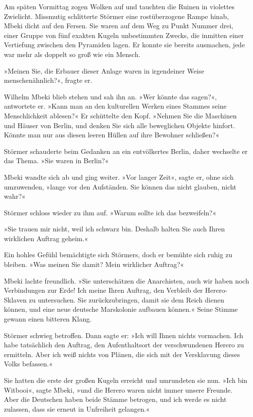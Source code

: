 \bigpar

Am späten Vormittag zogen Wolken auf und tauchten die Ruinen in
violettes Zwielicht. Missmutig schlitterte Störmer eine
rostüberzogene Rampe hinab, Mbeki dicht auf den Fersen. Sie waren
auf dem Weg zu Punkt Nummer drei, einer Gruppe von fünf exakten
Kugeln unbestimmten Zwecks, die inmitten einer Vertiefung zwischen
den Pyramiden lagen. Er konnte sie bereits ausmachen, jede war mehr
als doppelt so groß wie ein Mensch.

»Meinen Sie, die Erbauer dieser Anlage waren in irgendeiner Weise
menschenähnlich?«, fragte er.

Wilhelm Mbeki blieb stehen und sah ihn an. »Wer könnte das sagen?«,
antwortete er. »Kann man an den kulturellen Werken eines Stammes
seine Menschlichkeit ablesen?« Er schüttelte den Kopf. »Nehmen Sie
die Maschinen und Häuser von Berlin, und denken Sie sich alle
beweglichen Objekte hinfort. Könnte man nur aus diesen leeren
Hüllen auf ihre Bewohner schließen?«

Störmer schauderte beim Gedanken an ein entvölkertes Berlin, daher
wechselte er das Thema. »Sie waren in Berlin?«

Mbeki wandte sich ab und ging weiter. »Vor langer Zeit«, sagte er,
ohne sich umzuwenden, »lange vor den Aufständen. Sie können das
nicht glauben, nicht wahr?«

Störmer schloss wieder zu ihm auf. »Warum sollte ich das
bezweifeln?«

»Sie trauen mir nicht, weil ich schwarz bin. Deshalb halten Sie
auch Ihren wirklichen Auftrag geheim.«

Ein hohles Gefühl bemächtigte sich Störmers, doch er bemühte sich
ruhig zu bleiben. »Was meinen Sie damit? Mein wirklicher Auftrag?«

Mbeki lachte freundlich. »Sie unterschätzen die Anarchisten, auch
wir haben noch Verbindungen zur Erde! Ich meine Ihren Auftrag, den
Verbleib der Herero-Sklaven zu untersuchen. Sie zurückzubringen,
damit sie dem Reich dienen können, und eine neue deutsche
Marskolonie aufbauen können.« Seine Stimme gewann einen bitteren
Klang.

Störmer schwieg betroffen. Dann sagte er: »Ich will Ihnen nichts
vormachen. Ich habe tatsächlich den Auftrag, den Aufenthaltsort der
verschwundenen Herero zu ermitteln. Aber ich weiß nichts von
Plänen, die sich mit der Versklavung dieses Volks befassen.«

Sie hatten die erste der großen Kugeln erreicht und umrundeten sie
nun. »Ich bin Witbooi«, sagte Mbeki, »und die Herero waren nicht
immer unsere Freunde. Aber die Deutschen haben beide Stämme
betrogen, und ich werde es nicht zulassen, dass sie erneut in
Unfreiheit gelangen.«

